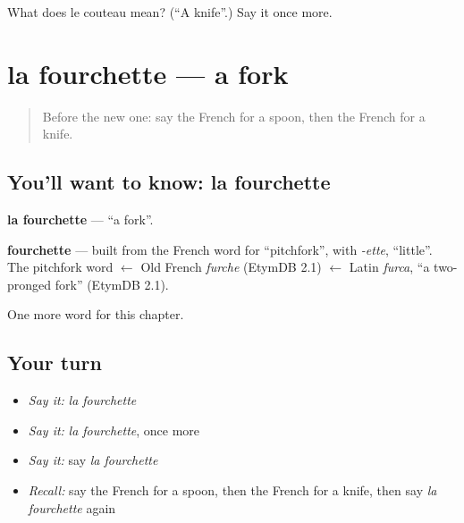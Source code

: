 \begin{tcolorbox}[breakable,colback=teal!4,colframe=teal!35!black,title={Before you move on}]
What does le couteau mean? (\textquotedblleft{}A knife\textquotedblright{}.) Say it once more.
\end{tcolorbox}
\section[la fourchette]{la fourchette — a fork}

\label{lesson:FR-C77-fourchette}



\begin{quote}
Before the new one: say the French for a spoon, then the French for a knife.
\end{quote}

\subsection*{You'll want to know: la fourchette}
\textbf{la fourchette} — \textquotedblleft{}a fork\textquotedblright{}.

\begin{cousinweb}
\textbf{fourchette} — built from the French word for \textquotedblleft{}pitchfork\textquotedblright{}, with \emph{-ette}, \textquotedblleft{}little\textquotedblright{}. The pitchfork word $\leftarrow$ Old French \emph{furche} (EtymDB 2.1) $\leftarrow$ Latin \emph{furca}, \textquotedblleft{}a two-pronged fork\textquotedblright{} (EtymDB 2.1).
\end{cousinweb}

\begin{grammarlens}[title={What you've built}]
One more word for this chapter.
\end{grammarlens}

\subsection*{Your turn}
\begin{itemize}
\raggedright
  \item \emph{Say it:} \emph{la fourchette}
  \item \emph{Say it:} \emph{la fourchette}, once more
  \item \emph{Say it:} say \emph{la fourchette}
  \item \emph{Recall:} say the French for a spoon, then the French for a knife, then say \emph{la fourchette} again
\end{itemize}

